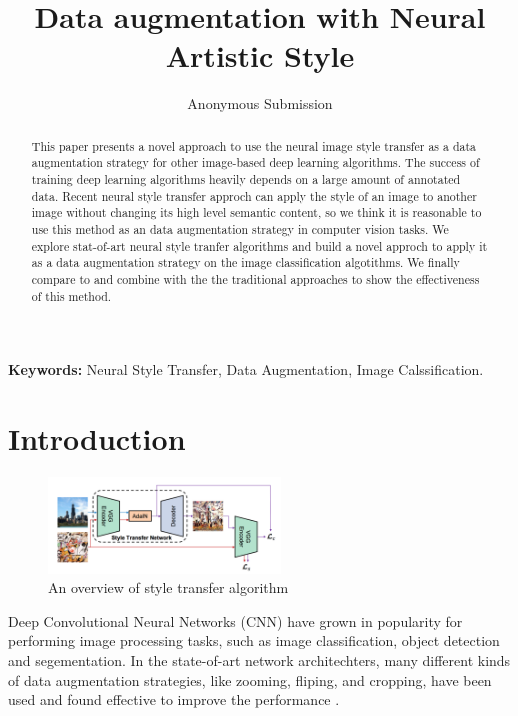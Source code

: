 \documentclass[a4paper,11pt]{article}
\begin{document}
\title{Data augmentation with Neural Artistic Style}
\author{Anonymous Submission}
\date{}
\maketitle
\thispagestyle{empty}


\begin{abstract}
This paper presents a novel approach to use the neural image style transfer as a data augmentation strategy for other image-based deep learning algorithms. The success of training deep learning algorithms heavily depends on a large amount of annotated data. Recent neural style transfer approch can apply the style of an image to another image without changing its high level semantic content, so we think it is reasonable to use this method as an data augmentation strategy in computer vision tasks. We explore stat-of-art neural style tranfer algorithms and build a novel approch to apply it as a data augmentation strategy on the image classification algotithms. We finally compare to and combine with the the traditional approaches to show the effectiveness of this method.
\end{abstract}
\textbf{Keywords:} Neural Style Transfer, Data Augmentation, Image Calssification.

\section{Introduction}
\begin{figure}
  \vspace{-20pt}
  \begin{center}
    \includegraphics[width=0.55\textwidth, height=0.25\textwidth]{overview.png}
\end{center}
\vspace{-20pt}
  \caption{An overview of style transfer algorithm \cite{huang2017arbitrary}}
  \vspace{-0pt}
\end{figure}
Deep Convolutional Neural Networks (CNN) have grown in popularity for performing image processing tasks, such as image classification, object detection and segementation. In the state-of-art network architechters, many different kinds of data augmentation strategies, like zooming, fliping, and cropping, have been used and found effective to improve the performance \cite{krizhevsky2012imagenet} \cite{simonyan2014very} .
\end{document}
